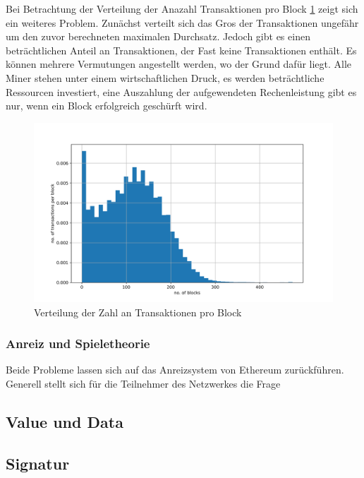 \documentclass[runningheads]{llncs}
\begin{document}
Bei Betrachtung der Verteilung der Anazahl Transaktionen pro Block \ref{blocks_transactions_per_block} zeigt sich ein weiteres Problem. Zunächst verteilt sich das Gros der Transaktionen ungefähr um den zuvor berechneten maximalen Durchsatz. Jedoch gibt es einen beträchtlichen Anteil an Transaktionen, der Fast keine Transaktionen enthält. Es können mehrere Vermutungen angestellt werden, wo der Grund dafür liegt. Alle Miner stehen unter einem wirtschaftlichen Druck, es werden beträchtliche Ressourcen investiert, eine Auszahlung der aufgewendeten Rechenleistung gibt es nur, wenn ein Block erfolgreich geschürft wird. \cite{research_empty_nodate}

\begin{figure}[h]
  \includegraphics[width=\textwidth, keepaspectratio]{blocks_transactions_per_block.png}
  \caption{Verteilung der Zahl an Transaktionen pro Block \cite{neemann_appendix_nodate}}
  \label{blocks_transactions_per_block}
\end{figure}

\subsubsection{Anreiz und Spieletheorie}
Beide Probleme lassen sich auf das Anreizsystem von Ethereum zurückführen. Generell stellt sich für die Teilnehmer des Netzwerkes die Frage  

\subsection{Value und Data}

\subsection{Signatur}
\end{document}
